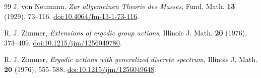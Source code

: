 \documentclass[10pt]{article}
\theoremstyle{remark}
\begin{document}
\begin{thebibliography}{99}
J. von Neumann, \emph{Zur allgemeinen Theorie des Masses}, Fund. Math. \textbf{13} (1929), 73--116. \href{https://doi.org/10.4064/fm-13-1-73-116}{doi:10.4064/fm-13-1-73-116}.

R. J. Zimmer, \emph{Extensions of ergodic group actions}, Illinois J. Math. \textbf{20} (1976), 373--409. \href{https://doi.org/10.1215/ijm/1256049780}{doi:10.1215/ijm/1256049780}.

R. J. Zimmer, \emph{Ergodic actions with generalized discrete spectrum}, Illinois J. Math. \textbf{20} (1976), 555--588. \href{https://doi.org/10.1215/ijm/1256049648}{doi:10.1215/ijm/1256049648}.

\end{thebibliography}
\end{document}
